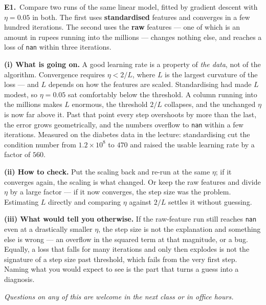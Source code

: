 \documentclass[10pt,a4paper]{article}
\begin{document}
\textbf{E1.}\ Compare two runs of the same linear model, fitted by gradient descent with $\eta = 0.05$ in both. The
first uses \textbf{standardised} features and converges in a few hundred iterations. The second uses the
\textbf{raw} features --- one of which is an amount in rupees running into the millions --- changes nothing
else, and reaches a loss of \texttt{nan} within three iterations.

\vspace{4pt}

\textbf{(i) What is going on.} A good learning rate is a property of \emph{the data}, not of the algorithm. Convergence requires $\eta < 2/L$, where $L$ is the largest curvature of the loss --- and $L$ depends on how the features are scaled. Standardising had made $L$ modest, so $\eta = 0.05$ sat comfortably below the threshold. A column running into the millions makes $L$ enormous, the threshold $2/L$ collapses, and the unchanged $\eta$ is now far above it. Past that point every step overshoots by more than the last, the error grows geometrically, and the numbers overflow to \texttt{nan} within a few iterations. Measured on the diabetes data in the lecture: standardising cut the condition number from $1.2 \times 10^{8}$ to $470$ and raised the usable learning rate by a factor of $560$.\par\vspace{1mm}\textbf{(ii) How to check.} Put the scaling back and re-run at the same $\eta$; if it converges again, the scaling is what changed. Or keep the raw features and divide $\eta$ by a large factor --- if it now converges, the step size was the problem. Estimating $L$ directly and comparing $\eta$ against $2/L$ settles it without guessing.\par\vspace{1mm}\textbf{(iii) What would tell you otherwise.} If the raw-feature run still reaches \texttt{nan} even at a drastically smaller $\eta$, the step size is not the explanation and something else is wrong --- an overflow in the squared term at that magnitude, or a bug. Equally, a loss that falls for many iterations and only then explodes is not the signature of a step size past threshold, which fails from the very first step. Naming what you would expect to see is the part that turns a guess into a diagnosis.

\vfill

{\footnotesize\itshape Questions on any of this are welcome in the next class or in office hours.}

\newpage
\end{document}
